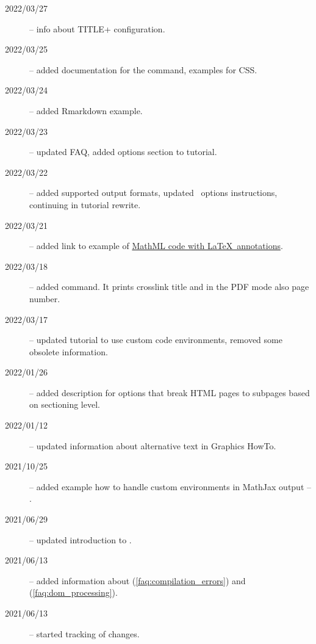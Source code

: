 \begin{description}
  \item[2022/03/27] -- info about TITLE+ configuration.
  \item[2022/03/25] -- added documentation for the  command, examples for CSS.
  \item[2022/03/24] -- added Rmarkdown example.
  \item[2022/03/23] -- updated FAQ, added options section to tutorial.
  \item[2022/03/22] -- added supported output formats, updated \fourhtsty\ options instructions, continuing in tutorial rewrite.
  \item[2022/03/21] -- added link to example of \href{https://tex.stackexchange.com/a/637910/2891}{MathML code with \LaTeX\ annotations}.
  \item[2022/03/18] -- added \texcommand{\namerefpage} command. It prints crosslink title and in the PDF mode also page number.
  \item[2022/03/17] -- updated tutorial to use custom code environments, removed some obsolete information.
  \item[2022/01/26] -- added description for options that break HTML pages to subpages based on sectioning level.
  \item[2022/01/12] -- updated information about alternative text in Graphics HowTo.
  \item[2021/10/25] -- added example how to handle custom environments in MathJax output -- .
  \item[2021/06/29] -- updated introduction to .
  \item[2021/06/13] -- added information  about  (\ref{faq:compilation_errors}) and  (\ref{faq:dom_processing}).
  \item[2021/06/13] -- started tracking of changes.
\end{description}

